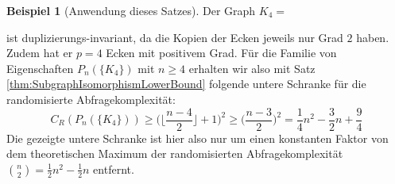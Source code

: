 \documentclass[10pt,a4paper, footheight=1mm]{scrreprt}
\theoremstyle{definition}
\newtheorem{examplex}{Beispiel}
\newenvironment{example}[1]
{ \begin{leftbar} \begin{examplex}#1}
{ \end{examplex} \ignorespacesafterend \end{leftbar} }
\begin{document}
\begin{example}[Anwendung dieses Satzes]
Der Graph $K_4 =$
 ist duplizierungs-invariant, da die Kopien
der Ecken jeweils nur Grad $2$ haben. Zudem
hat er $p=4$ Ecken mit positivem Grad. Für die Familie von
Eigenschaften $P_n(\{K_4\})$ mit $ n\geq 4$ erhalten wir also
mit Satz \ref{thm:SubgraphIsomorphismLowerBound} folgende
untere Schranke für die randomisierte Abfragekomplexität:
$$ C_R(P_n(\{K_4\})) \geq 
\Big ( \Big \lfloor  \frac{n-4}{2} \Big \rfloor + 1 \Big ) ^2 \geq
\Big ( \frac{n-3}{2} \Big ) ^2 = 
\frac{1}{4} n^2 - \frac{3}{2} n + \frac{9}{4} 
$$
Die gezeigte untere Schranke ist hier also nur um einen
konstanten Faktor von dem theoretischen Maximum
der randomisierten Abfragekomplexität
$\binom{n}{2} = \frac{1}{2}n^2 - \frac{1}{2}n$
entfernt.
\end{example}
\end{document}
